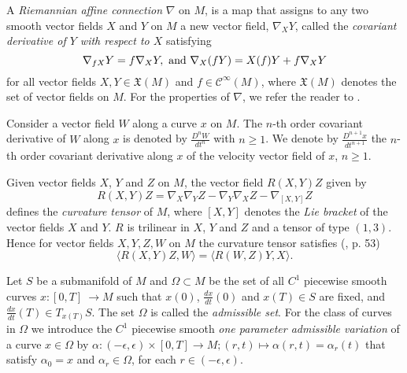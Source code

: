 \documentclass[letterpaper, 10 pt, conference]{ieeeconf}  %
\begin{document}

A \textit{Riemannian affine connection} $\nabla$ on $M$, is a map that assigns to any two smooth vector fields $X$ and $Y$ on $M$ a new vector field, $\nabla_{X}Y$, called the \textit{covariant derivative of $Y$ with respect to $X$} satisfying $$\nabla_{fX}Y=f\nabla_XY,\hbox{ and } \nabla_X(fY)=X(f)Y+f\nabla_XY$$ for all vector fields $X,Y\in\mathfrak{X}(M)$ and $f\in\mathcal{C}^{\infty}(M)$, where $\mathfrak{X}(M)$ denotes the set of vector fields on $M$. For the properties of $\nabla$, we refer the reader to \cite{Boothby, bookBullo,Milnor}.



Consider a vector field $W$ along a curve $x$ on $M$. The $n$-th order covariant derivative of $W$ along $x$ is denoted by $\displaystyle{\frac{D^n W}{dt^n}}$ with $n\geq1$. We denote by $\displaystyle{\frac{D^{n+1} x}{dt^{n+1}}}$ the $n$-th order covariant derivative along $x$ of the velocity vector field of $x$, $n \geq 1$. 


Given vector fields $X$, $Y$
and $Z$ on $M$, the vector field $R(X,Y)Z$ given by \begin{equation}\label{eq:CurvatureTensorDefinition}
R(X,Y)Z=\nabla_{X}\nabla_{Y}Z-\nabla_{Y}\nabla_{X}Z-\nabla_{[X,Y]}Z
\end{equation}  defines the \textit{curvature tensor} of $M$, where $[X,Y]$ denotes the \textit{Lie bracket} of the vector fields $X$ and $Y$. $R$ is trilinear in $X$, $Y$ and $Z$ and a tensor of type $(1,3)$. Hence for vector fields $X,Y,Z,W$ on $M$ the curvature tensor satisfies (\cite{Milnor}, p. 53)
\begin{equation}\label{curvformula}\langle R(X,Y)Z,W\rangle=\langle R(W,Z)Y,X\rangle.\end{equation}


Let $S$ be a submanifold of $M$ and $\Omega\subset M$ be the set of all $C^{1}$ piecewise smooth curves $x : [0,T] \ \rightarrow M$ such that $x(0)$, $\frac{dx}{dt}(0)$ and $x(T) \in S$ are fixed, and $\frac{dx}{dt}(T) \in T_{x(T)}S$. The set $\Omega$ is called the \textit{admissible set}. For the class of curves in $\Omega$ we introduce the $C^1$ piecewise smooth \textit{one parameter admissible variation} of a curve $x \in \Omega$ by $\alpha : (-\epsilon,\epsilon) \times [0,T] \rightarrow M ;(r,t) \mapsto\alpha(r,t) = \alpha_r(t)$ that satisfy $\alpha_{0} = x$ and $\alpha_r \in \Omega$, for each $r \in (-\epsilon, \epsilon) $. 
 
\end{document}

